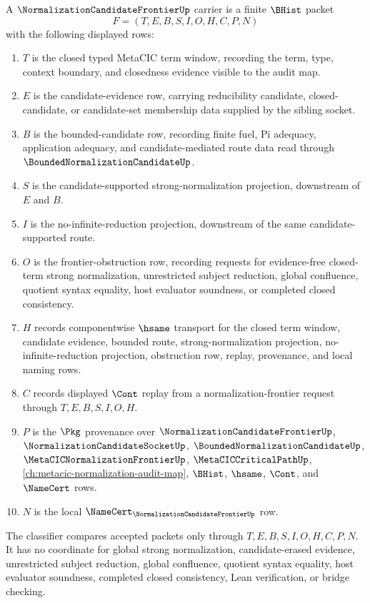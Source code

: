 \begin{definition}
\label{def:normalization-candidate-frontier-carrier}
A $\NormalizationCandidateFrontierUp$ carrier is a finite $\BHist$ packet
$$
F=(T,E,B,S,I,O,H,C,P,N)
$$
with the following displayed rows:
\begin{enumerate}
\item $T$ is the closed typed MetaCIC term window, recording the term, type, context boundary, and closedness evidence visible to the audit map.
\item $E$ is the candidate-evidence row, carrying reducibility candidate, closed-candidate, or candidate-set membership data supplied by the sibling socket.
\item $B$ is the bounded-candidate row, recording finite fuel, Pi adequacy, application adequacy, and candidate-mediated route data read through $\BoundedNormalizationCandidateUp$.
\item $S$ is the candidate-supported strong-normalization projection, downstream of $E$ and $B$.
\item $I$ is the no-infinite-reduction projection, downstream of the same candidate-supported route.
\item $O$ is the frontier-obstruction row, recording requests for evidence-free closed-term strong normalization, unrestricted subject reduction, global confluence, quotient syntax equality, host evaluator soundness, or completed closed consistency.
\item $H$ records componentwise $\hsame$ transport for the closed term window, candidate evidence, bounded route, strong-normalization projection, no-infinite-reduction projection, obstruction row, replay, provenance, and local naming rows.
\item $C$ records displayed $\Cont$ replay from a normalization-frontier request through $T,E,B,S,I,O,H$.
\item $P$ is the $\Pkg$ provenance over $\NormalizationCandidateFrontierUp$, $\NormalizationCandidateSocketUp$, $\BoundedNormalizationCandidateUp$, $\MetaCICNormalizationFrontierUp$, $\MetaCICCriticalPathUp$, \autoref{ch:metacic-normalization-audit-map}, $\BHist$, $\hsame$, $\Cont$, and $\NameCert$ rows.
\item $N$ is the local $\NameCert_{\NormalizationCandidateFrontierUp}$ row.
\end{enumerate}
The classifier compares accepted packets only through $T,E,B,S,I,O,H,C,P,N$. It has no coordinate for global strong normalization, candidate-erased evidence, unrestricted subject reduction, global confluence, quotient syntax equality, host evaluator soundness, completed closed consistency, Lean verification, or bridge checking.
\end{definition}


